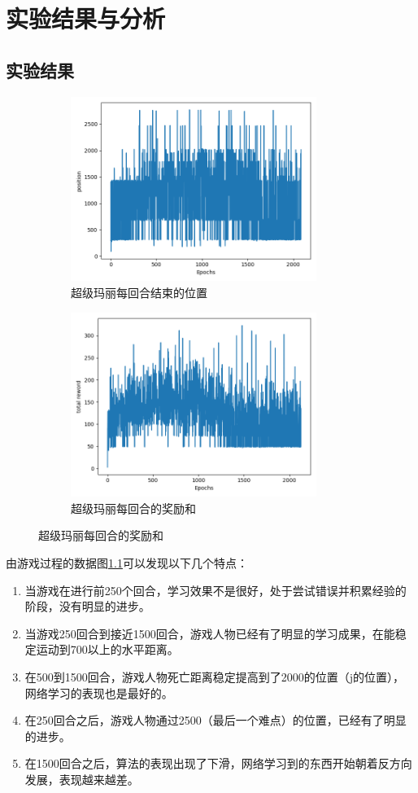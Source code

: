 \chapter{实验结果与分析}
\section{实验结果}
\begin{figure}[!htp]
    \centering
    \begin{subfigure}{6cm}
        \centering
        \includegraphics[height=6cm]{static/reword.png}
        \caption{超级玛丽每回合结束的位置}
    \end{subfigure}
    \hspace{4em}
    \begin{subfigure}{6cm}
      \centering
      \includegraphics[height=6cm]{static/myplot.png}
      \caption{超级玛丽每回合的奖励和}
    \end{subfigure}
    \label{fig:data}
\end{figure}
由游戏过程的数据图\ref{fig:data}可以发现以下几个特点：
\begin{enumerate}
    \item 当游戏在进行前250个回合，学习效果不是很好，处于尝试错误并积累经验的阶段，没有明显的进步。
    \item 当游戏250回合到接近1500回合，游戏人物已经有了明显的学习成果，在能稳定运动到700以上的水平距离。
    \item 在500到1500回合，游戏人物死亡距离稳定提高到了2000的位置（j的位置），网络学习的表现也是最好的。
    \item 在250回合之后，游戏人物通过2500（最后一个难点）的位置，已经有了明显的进步。
    \item 在1500回合之后，算法的表现出现了下滑，网络学习到的东西开始朝着反方向发展，表现越来越差。 
\end{enumerate}

